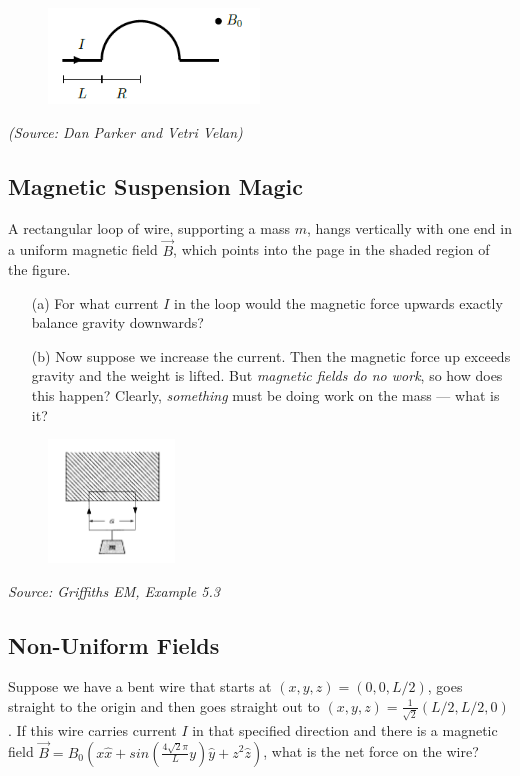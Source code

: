 \documentclass{article}
\begin{document}
\begin{figure}[h]
	\begin{center}
		\includegraphics[width=0.5\textwidth]{WireLoop.png}
	\end{center}
\end{figure}

\textit{(Source: Dan Parker and Vetri Velan)}

\subsection{Magnetic Suspension Magic}

A rectangular loop of wire, supporting a mass $m$, hangs vertically with one end in a uniform magnetic field $\vec{B}$, which points into the page in the shaded region of the figure. 
\begin{itemize}
	\item[(a)] For what current $I$ in the loop would the magnetic force upwards exactly balance gravity downwards? 
	\item[(b)] Now suppose we increase the current. Then the magnetic force up exceeds gravity and the weight is lifted. But \textit{magnetic fields do no work}, so how does this happen? Clearly, \textit{something} must be doing work on the mass --- what is it?
\end{itemize}

\begin{figure}[h]
	\begin{center}
		\includegraphics[width=0.3\textwidth]{Suspension.png}
	\end{center}
\end{figure}

\textit{Source: Griffiths EM, Example 5.3}

\subsection{Non-Uniform Fields}

Suppose we have a bent wire that starts at $(x,y,z)=(0,0,L/2)$, goes straight to the origin and then goes straight out to $(x,y,z)=\frac{1}{\sqrt{2}}(L/2,L/2,0)$. If this wire carries current $I$ in that specified direction and there is a magnetic field $\vec{B}=B_0(x\hat{x}+sin(\frac{4\sqrt{2}\pi}{L}y)\hat{y}+z^2\hat{z})$, what is the net force on the wire?
\end{document}

